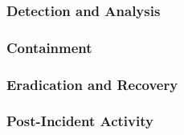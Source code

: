 \subsubsection{Detection and Analysis}
\subsubsection{Containment}
\subsubsection{Eradication and Recovery}
\subsubsection{Post-Incident Activity}
\subsection{}
\subsection{}
\subsection{}
\subsection{}
\subsection{}
\subsection{}




